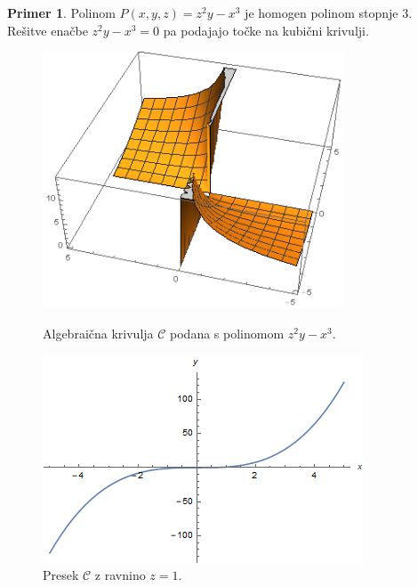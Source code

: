\documentclass[12pt,a4paper,twoside]{article}
\theoremstyle{definition} %
\newtheorem{primer}[definicija]{Primer}
\theoremstyle{plain} %
\numberwithin{equation}{section}  %
\begin{document}
\begin{primer}
Polinom $P(x,y,z) = z^2y-x^3$ je homogen polinom stopnje $3$. Rešitve enačbe $z^2y-x^3 = 0$ pa podajajo točke na kubični krivulji.
\begin{figure}[t]
  \centering
\begin{minipage}{.45\textwidth}
\centering
  \includegraphics[width=0.8\textwidth]{images/krivulja.png}
  \caption[Primer algebraične krivulje.]{Algebraična krivulja $\mathcal{C}$ podana s polinomom $z^2y-x^3$.}
  \label{fig:krivulja}
\end{minipage}%
\hfill
\begin{minipage}{.45\textwidth}
\centering
\includegraphics[scale=0.5]{images/projektivnaz.png}
\caption[Presek algebraične krivulje z ravnino $z=1$.]{Presek $\mathcal{C}$ z ravnino $z=1$.}
\label{fig:projektivnaz}
\end{minipage}
\end{figure}



\end{primer}
\end{document}
